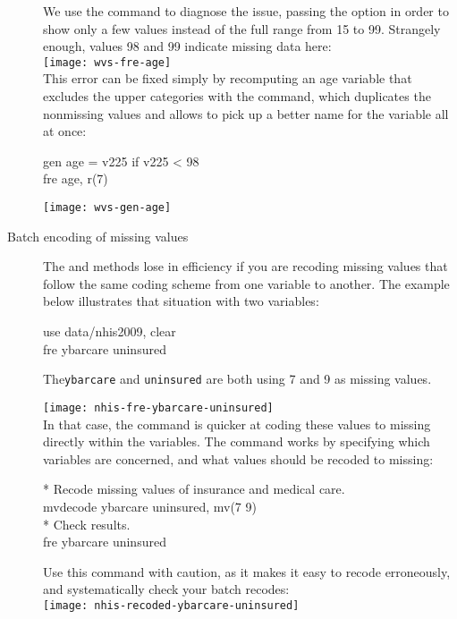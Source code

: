 \begin{description}
	We use the  command to diagnose the issue, passing the  option in order to show only a few values instead of the full range from 15 to 99. Strangely enough, values 98 and 99 indicate missing data here:\\[1em]

		\texttt{[image: wvs-fre-age]}\\[1em]
	
	This error can be fixed simply by recomputing an age variable that excludes the upper categories with the  command, which duplicates the nonmissing values and allows to pick up a better name for the variable all at once:

	\begin{docspec}
		gen age = v225 if v225 < 98\\
		fre age, r(7)
	\end{docspec}

\texttt{[image: wvs-gen-age]}\\[1em]

	\item[Batch encoding of missing values]%
	The  and  methods lose in efficiency if you are recoding missing values that follow the same coding scheme from one variable to another. The example below illustrates that situation with two \NHIS variables:\\[1em]

	\begin{docspec}
		use data/nhis2009, clear\\
		fre ybarcare uninsured
	\end{docspec}
	
	The\texttt{ybarcare} and \texttt{uninsured} are both using 7 and 9 as missing values.
	
	\texttt{[image: nhis-fre-ybarcare-uninsured]}\\[1em]

	In that case, the  command is quicker at coding these values to missing directly within the variables. The command works by specifying which variables are concerned, and what values should be recoded to missing:

	\begin{docspec}
		* Recode missing values of insurance and medical care.\\%
		mvdecode ybarcare uninsured, mv(7 9)\\[1em]%
		* Check results.\\%
		fre ybarcare uninsured\\%
	\end{docspec}
	
	Use this command with caution, as it makes it easy to recode erroneously, and systematically check your batch recodes:\\[1em]%

	\texttt{[image: nhis-recoded-ybarcare-uninsured]}
\end{description}

